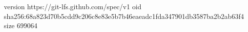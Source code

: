 version https://git-lfs.github.com/spec/v1
oid sha256:68a823d70b5cdd9c206c8e83e5b7b46eaeadc1fda347901db3587ba2b2ab63f4
size 699064
